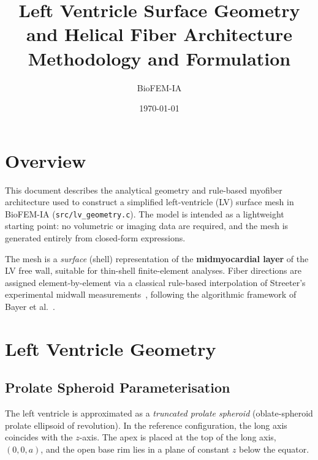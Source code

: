 \documentclass[11pt,a4paper]{article}
\title{Left Ventricle Surface Geometry and Helical Fiber Architecture\\
\large Methodology and Formulation}
\author{BioFEM-IA}
\date{\today}
\begin{document}
\maketitle
\tableofcontents
\vspace{1em}

\section{Overview}

This document describes the analytical geometry and rule-based myofiber
architecture used to construct a simplified left-ventricle (LV) surface mesh
in BioFEM-IA (\texttt{src/lv\_geometry.c}).  The model is intended as a
lightweight starting point: no volumetric or imaging data are required, and
the mesh is generated entirely from closed-form expressions.

The mesh is a \emph{surface} (shell) representation of the
\textbf{midmyocardial layer} of the LV free wall, suitable for thin-shell
finite-element analyses.  Fiber directions are assigned element-by-element via
a classical rule-based interpolation of Streeter's experimental midwall
measurements~\cite{Streeter1969}, following the algorithmic framework of Bayer
et al.~\cite{Bayer2012}.

\section{Left Ventricle Geometry}

\subsection{Prolate Spheroid Parameterisation}

The left ventricle is approximated as a \emph{truncated prolate spheroid}
(oblate-spheroid prolate ellipsoid of revolution).  In the reference
configuration, the long axis coincides with the $z$-axis.  The apex is
placed at the top of the long axis, $(0,0,a)$, and the open base rim lies in
a plane of constant $z$ below the equator.
\end{document}
